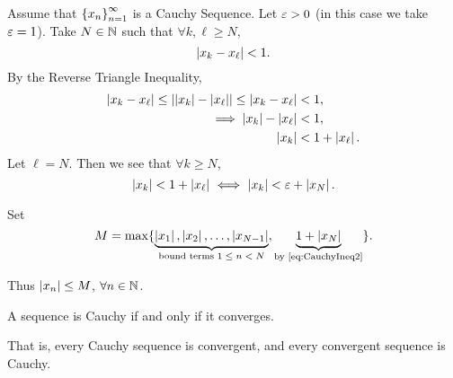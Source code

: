 \documentclass[12pt]{article}
\theoremstyle{definition}
\renewenvironment{proof}[1][\proofname]{\vspace{-10pt}\begin{replacementproof}}{\end{replacementproof}}
\newcommand{\xn}{\set{x_{n}}_{n = 1}^{\infty}}
\begin{document}
    \begin{proof}
        Assume that $\xn$ is a Cauchy Sequence. Let $\varepsilon > 0$ (in this case we take $\varepsilon = 1$). Take $N \in \mathbb{N}$ such that $\forall k, \ell \geq N$,
        \begin{equation}
            \left|x_{k} - x_{\ell}\right| < 1. \label{eq:CauchyBoundedIneq}
        \end{equation}
        By the Reverse Triangle Inequality,
        \begin{align*}
            \left|x_{k} - x_{\ell}\right| \leq \left|\left|x_{k}\right| - \left|x_{\ell}\right|\right| \leq \left|x_{k} - x_{\ell}\right| &< 1, \\
                                                                           \implies \left|x_{k}\right| - \left|x_{\ell}\right| &< 1, \\
                                                                           \left|x_{k}\right| &< 1 + \left|x_{\ell}\right|.
        \end{align*}
        Let $\ell = N$. Then we see that $\forall k \geq N$, 
        \begin{equation}
            \left|x_{k}\right| < 1 + \left|x_{\ell}\right| ~ \Longleftrightarrow ~ \left|x_{k}\right| < \varepsilon + \left|x_{N}\right|. \label{eq:CauchyIneq2}
        \end{equation}

        Set 
        \begin{equation*}
            M = \max\{\underbrace{\left|x_{1}\right|, \left|x_{2}\right|, \dots, \left|x_{N - 1}\right|}_{\text{bound terms $1 \leq n < N$}}, \underbrace{1 + \left|x_{N}\right|}_{\text{by \eqref{eq:CauchyIneq2}}}\}. 
        \end{equation*}

        Thus $\left|x_{n}\right| \leq M$, $\forall n \in \mathbb{N}$.
    \end{proof}
    \begin{theorem}
        A sequence is Cauchy if and only if it converges. 
    \end{theorem}
    \begin{remark}
        That is, every Cauchy sequence is convergent, and every convergent sequence is Cauchy. 
    \end{remark}
\end{document}
